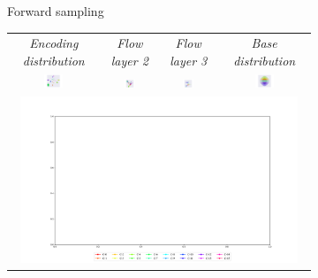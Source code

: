 \begin{figure}[t!]
\begin{subfigure}{\textwidth}
\begin{tabular}{cccc}
        \end{tabular}
        \caption{Forward sampling\\[0.5cm] }
    \end{subfigure}
    \begin{subfigure}{\textwidth}
        \centering
        \begin{tabular}{cccc}
            \textit{Encoding distribution} &
            \textit{Flow layer 2} & 
            \textit{Flow layer 3} & 
            \textit{Base distribution} \\
            \includegraphics[width=0.225\textwidth]{figures/experiments_figures/latent_space/set_modeling/layer_reverse_13.pdf} & 
            \includegraphics[width=0.225\textwidth]{figures/experiments_figures/latent_space/set_modeling/layer_reverse_07.pdf}  & 
            \includegraphics[width=0.225\textwidth]{figures/experiments_figures/latent_space/set_modeling/layer_reverse_04.pdf}  & 
            \includegraphics[width=0.225\textwidth]{figures/experiments_figures/latent_space/set_modeling/layer_reverse_01.pdf}
            \\
            \multicolumn{4}{c}{\includegraphics[width=0.95\textwidth]{figures/experiments_figures/latent_space/set_modeling/legend_visu.pdf}}\\

\end{tabular}
\end{subfigure}
\end{figure}
